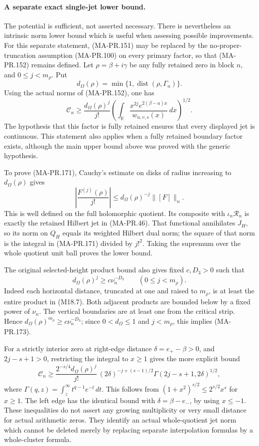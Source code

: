 \paragraph{A separate exact single-jet lower bound.}
The potential is sufficient, not asserted necessary.
There is nevertheless an intrinsic norm lower bound
which is useful when assessing possible improvements.
For this separate statement, (MA-PR.151) may be
replaced by the no-proper-truncation assumption
(MA-PR.100) on every primary factor, so that
(MA-PR.152) remains defined.
Let \(\rho=\beta+i\gamma\) be any fully retained zero
in block \(n\), and \(0\le j<m_\rho\).  Put
\[
 d_\Omega(\rho)
      =\min\{1,\operatorname{dist}(\rho,\Gamma_n)\}.
\]
Using the actual norms of (MA-PR.152), one has
\[
 \mathcal C_n\ge
 \frac{d_\Omega(\rho)^j}{j!}
 \left(\int_{\mathbb R}
       \frac{x^{2j}e^{2(\beta-a)x}}{w_{u,v,s}(x)}\,dx\right)^{1/2}.
 \tag{MA-PR.171}
\]
The hypothesis that this factor is fully retained
ensures that every displayed jet is continuous.
This statement also applies when a fully retained
boundary factor exists, although the main upper
bound above was proved with the generic hypothesis.

To prove (MA-PR.171), Cauchy's estimate on disks
of radius increasing to \(d_\Omega(\rho)\) gives
\[
        \left|\frac{F^{(j)}(\rho)}{j!}\right|
               \le d_\Omega(\rho)^{-j}\|[F]\|_n .
 \tag{MA-PR.172}
\]
This is well defined on the full holomorphic quotient.
Its composite with \(\iota_n\mathscr R_n\) is exactly
the retained Hilbert jet in (MA-PR.46).
That functional annihilates \(J_H\), so its norm
on \(Q_H\) equals its weighted Hilbert dual norm;
the square of that norm is the integral in
(MA-PR.171) divided by \(j!^2\).
Taking the supremum over the whole quotient unit
ball proves the lower bound.

The original selected-height product bound also gives
fixed \(c,D_3>0\) such that
\[
              d_\Omega(\rho)^j\ge c\nu_n^{-D_3}
                         \qquad(0\le j<m_\rho).
 \tag{MA-PR.173}
\]
Indeed each horizontal distance, truncated at one
and raised to \(m_\rho\), is at least the entire
product in (M18.7).  Both adjacent products are
bounded below by a fixed power of \(\nu_n\).
The vertical boundaries are at least one from
the critical strip.  Hence
\(d_\Omega(\rho)^{m_\rho}\ge c\nu_n^{-D_3}\);
since \(0<d_\Omega\le1\) and \(j<m_\rho\), this
implies (MA-PR.173).

For a strictly interior zero at right-edge distance
\(\delta=e_+-\beta>0\), and \(2j-s+1>0\), restricting
the integral to \(x\ge1\) gives the more explicit
bound
\[
 \mathcal C_n\ge
 \frac{2^{-s/4}d_\Omega(\rho)^j}{j!}\,
 (2\delta)^{-j+(s-1)/2}
                  \Gamma(2j-s+1,2\delta)^{1/2},
 \tag{MA-PR.174}
\]
where \(\Gamma(q,z)=\int_z^\infty t^{q-1}e^{-t}\,dt\).
This follows from
\((1+x^2)^{s/2}\le2^{s/2}x^s\) for \(x\ge1\).
The left edge has the identical bound with
\(\delta=\beta-e_-\), by using \(x\le-1\).
These inequalities do not assert any growing
multiplicity or very small distance for actual
arithmetic zeros.  They identify an actual
whole-quotient jet norm which cannot be deleted
merely by replacing separate interpolation
formulas by a whole-cluster formula.

